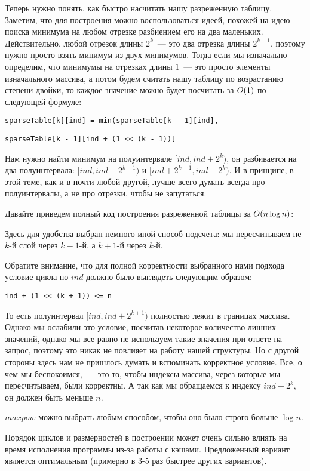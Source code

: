 Теперь нужно понять, как быстро насчитать нашу разреженную таблицу. Заметим, что для построения можно воспользоваться идеей, похожей на идею поиска минимума на любом отрезке разбиением его на два маленьких. Действительно, любой отрезок длины $2^{k}$~--- это два отрезка длины $2^{k - 1}$, поэтому нужно просто взять минимум из двух минимумов. Тогда если мы изначально определим, что минимумы на отрезках длины $1$~--- это просто элементы изначального массива, а потом будем считать нашу таблицу по возрастанию степени двойки, то каждое значение можно будет посчитать за $O(1)$ по следующей формуле:

\verb^sparseTable[k][ind] = min(sparseTable[k - 1][ind],^

\verb^sparseTable[k - 1][ind + (1 << (k - 1))]^

Нам нужно найти минимум на полуинтервале $[ind, ind + 2^k)$, он разбивается на два полуинтервала: $[ind, ind + 2^{k - 1})$ и $[ind + 2^{k - 1}, ind + 2^k)$. И в принципе, в этой теме, как и в почти любой другой, лучше всего думать всегда про полуинтервалы, а не про отрезки, чтобы не запутаться.

Давайте приведем полный код построения разреженной таблицы за $O(n \log n)$:



Здесь для удобства выбран немного иной способ подсчета: мы пересчитываем не $k$-й слой через $k-1$-й, а $k+1$-й через $k$-й.

Обратите внимание, что для полной корректности выбранного нами подхода условие цикла по $ind$ должно было выглядеть следующим образом:

\verb^ind + (1 << (k + 1)) <= n^

То есть полуинтервал $[ind, ind + 2^{k + 1})$ полностью лежит в границах массива. Однако мы ослабили это условие, посчитав некоторое количество лишних значений, однако мы все равно не используем такие значения при ответе на запрос, поэтому это никак не повлияет на работу нашей структуры. Но с другой стороны здесь нам не пришлось думать и вспоминать корректное условие. Все, о чем мы беспокоимся,~--- это то, чтобы индексы массива, через которые мы пересчитываем, были корректны. А так как мы обращаемся к индексу $ind + 2^k$, он должен быть меньше $n$.

$maxpow$ можно выбрать любым способом, чтобы оно было строго больше $\log n$.

\begin{observation}
    Порядок циклов и размерностей в построении может очень сильно влиять на время исполнения программы из-за работы с кэшами. Предложенный вариант является оптимальным (примерно в 3-5 раз быстрее других вариантов).
\end{observation}

